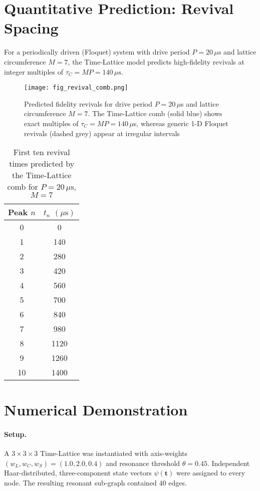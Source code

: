 \documentclass[11pt]{article}
\begin{document}
\section{Quantitative Prediction: Revival Spacing}\label{sec:comb}
For a periodically driven (Floquet) system with drive period $P = 20\,\mu\mathrm{s}$ and lattice circumference $M = 7$, the Time‑Lattice model predicts high‑fidelity revivals at integer multiples of $\tau_C = M P = 140\,\mu\mathrm{s}$.

\begin{figure}[htbp!]
  \centering
  \texttt{[image: fig\_revival\_comb.png]}
  \caption{Predicted fidelity revivals for drive period
           $P=20\,\mu$s and lattice circumference $M=7$.  The
           Time-Lattice comb (solid blue) shows exact multiples of
           $\tau_C=MP=140\,\mu$s, whereas generic 1-D Floquet revivals
           (dashed grey) appear at irregular intervals}
  \label{fig:comb}
\end{figure}

\begin{table}[htbp!]
  \centering
  \begin{tabular}{cc}
    \hline
    Peak $n$ & $t_n$ $(\mu\mathrm{s})$ \\
    \hline
    0  &   0  \\
    1  & 140  \\
    2  & 280  \\
    3  & 420  \\
    4  & 560  \\
    5  & 700  \\
    6  & 840  \\
    7  & 980  \\
    8  & 1120 \\
    9  & 1260 \\
    10 & 1400 \\
    \hline
  \end{tabular}
  \caption{First ten revival times predicted by the Time-Lattice comb for $P=20\,\mu\mathrm{s}$, $M=7$}
  \label{tab:comb}
\end{table}

\section{Numerical Demonstration}\label{sec:numerics}
\paragraph{Setup.}\par
A $3\times3\times3$ Time-Lattice was instantiated with axis-weights
$(w_L,\allowbreak w_C,\allowbreak w_S)\allowbreak
=\allowbreak(1.0,\allowbreak 2.0,\allowbreak 0.4)$ and resonance
threshold $\theta = 0.45$. Independent Haar-distributed, three-component state
vectors $\psi(\mathbf t)$ were assigned to every node.
The resulting resonant sub-graph contained $40$ edges.
\end{document}
